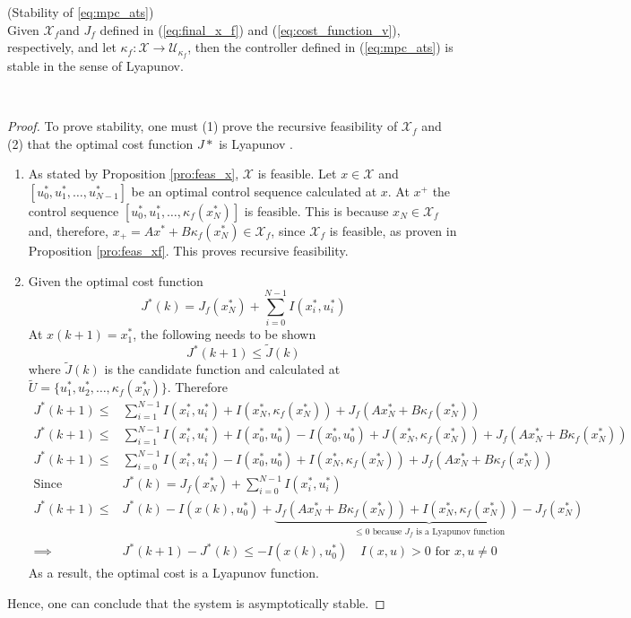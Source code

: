  


\begin{proposition}{(Stability of \ref{eq:mpc_ats})}\\

	Given $\mathcal{X}_f$and $J_f$ defined in (\ref{eq:final_x_f}) and (\ref{eq:cost_function_v}), respectively, and let $\kappa_f:\mathcal{X}\rightarrow\mathcal{U}_{\kappa_f}$,  then the controller defined in (\ref{eq:mpc_ats}) is stable in the sense of Lyapunov.
\end{proposition}\\
\begin{proof}
 To prove stability, one must (1) prove the recursive feasibility of $\mathcal{X}_f$ and (2) that the optimal cost function $J*$ is Lyapunov .
\begin{enumerate}
	\item As stated by Proposition \ref{pro:feas_x}, $\mathcal{X}$ is feasible. Let $x\in \mathcal{X}$ and $[u^*_0, u^*_1, \dots, u^*_{N-1}]$ be an optimal control sequence calculated at $x$. At $x^+$ the control sequence $[u^*_0, u^*_1, \dots, \kappa_f(x^*_N)]$ is feasible. This is because $x_N\in \mathcal{X}_f$ and, therefore, $x_+=Ax^*+B\kappa_f(x^*_N) \in \mathcal{X}_f$, since $\mathcal{X}_f$ is feasible, as proven in Proposition \ref{pro:feas_xf}. This proves recursive feasibility.
	\item Given the optimal cost function
	\begin{equation*}
	J^*(k) = J_f(x^*_N)+\sum_{i=0}^{N-1}I(x^*_i, u^*_i)
	\end{equation*}
	At $x(k+1) = x^*_1$, the following needs to be shown
	\begin{equation*}
		J^*(k+1) \leq \widetilde{J}(k)
	\end{equation*}
	where $\widetilde{J}(k)$ is the candidate function and calculated at $\widetilde{U} = \{u^*_1, u^*_2, \dots, \kappa_f(x^*_N)\}$. Therefore
	\begin{align*}
		J^*(k+1) \leq& \sum_{i=1}^{N-1}I(x^*_i, u^*_i) + I(x^*_N, \kappa_f(x^*_N)) + J_f(Ax^*_N + B \kappa_f(x^*_N))\\
		J^*(k+1) \leq& \sum_{i=1}^{N-1}I(x^*_i, u^*_i) +I(x^*_0, u^*_0)-I(x^*_0, u^*_0) + J(x^*_N, \kappa_f(x^*_N)) + J_f(Ax^*_N + B \kappa_f(x^*_N))\\
		J^*(k+1) \leq& \sum_{i=0}^{N-1}I(x^*_i, u^*_i) -I(x^*_0, u^*_0) + I(x^*_N, \kappa_f(x^*_N)) + J_f(Ax^*_N + B \kappa_f(x^*_N))\\
		\text{Since }&J^*(k) = J_f(x^*_N)+\sum_{i=0}^{N-1}I(x^*_i, u^*_i)\\
		J^*(k+1) \leq& J^*(k)  -I(x(k), u^*_0)+  \underset{\leq 0 \text{ because $J_f$ is a Lyapunov function}}{\underbrace{J_f(Ax^*_N + B \kappa_f(x^*_N)) + I(x^*_N, \kappa_f(x^*_N)) - J_f(x^*_N)}}\\
		\implies& J^*(k+1) - J^*(k) \leq -I(x(k), u^*_0) \quad I(x,u) >0 \text{ for }x,u \neq 0
	\end{align*}
	As a result, the optimal cost is a Lyapunov function. \\
\end{enumerate}
Hence, one can conclude that the system is asymptotically stable. 
\end{proof}



